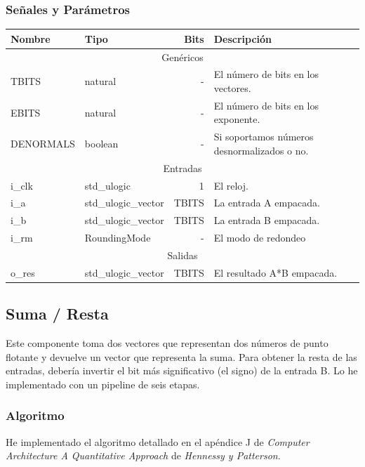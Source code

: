 \documentclass[a4paper]{article}
\begin{document}
\subsubsection{Señales y Parámetros}

\begin{tabular}{| l | l | r | l |}
\hline
\textbf{Nombre} & \textbf{Tipo} & \textbf{Bits} & \textbf{Descripción} \\ \hline
\multicolumn{4}{|c|}{Genéricos} \\ \hline
TBITS & natural & - & El número de bits en los vectores. \\
EBITS & natural & - & El número de bits en los exponente. \\
DENORMALS & boolean & - & Si soportamos números desnormalizados o no. \\ \hline
\multicolumn{4}{|c|}{Entradas} \\ \hline
i\_clk & std\_ulogic & 1 & El reloj. \\
i\_a & std\_ulogic\_vector & TBITS & La entrada A empacada. \\
i\_b & std\_ulogic\_vector & TBITS & La entrada B empacada. \\
i\_rm & RoundingMode & - & El modo de redondeo \\ \hline
\multicolumn{4}{|c|}{Salidas} \\ \hline
o\_res & std\_ulogic\_vector & TBITS & El resultado A*B empacada. \\ \hline
\end{tabular}

\subsection{Suma / Resta}

Este componente toma dos vectores que representan dos números de punto flotante y devuelve un vector que representa la suma. Para obtener la resta de las entradas, debería invertir el bit más significativo (el signo) de la entrada B. Lo he implementado con un pipeline de seis etapas.

\subsubsection{Algoritmo}

He implementado el algoritmo detallado en el apéndice J de \textit{Computer Architecture A Quantitative Approach} de \textit{Hennessy y Patterson}.
\end{document}
